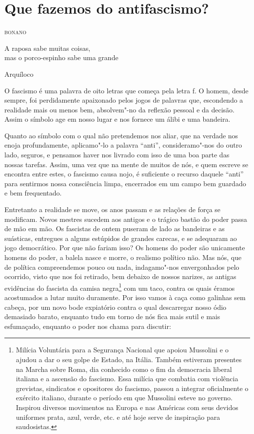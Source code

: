 \chapter{Que fazemos do antifascismo?}

\hfill{}\textsc{bonano}

\bigskip

\epigraph{A raposa sabe muitas coisas,\\mas o porco-espinho sabe uma grande}{Arquíloco}


O fascismo é uma palavra de oito letras que começa pela letra f. O
homem, desde sempre, foi perdidamente apaixonado pelos jogos de palavras
que, escondendo a realidade mais ou menos bem, absolvem"-no da reflexão
pessoal e da decisão. Assim o símbolo age em nosso lugar e nos fornece
um álibi e uma bandeira.

Quanto ao símbolo com o qual não pretendemos nos aliar, que na verdade
nos enoja profundamente, aplicamo"-lo a palavra ``anti'', consideramo"-nos
do outro lado, seguros, e pensamos haver nos livrado com isso de uma boa
parte das nossas tarefas. Assim, uma vez que na mente de muitos de nós,
e quem escreve se encontra entre estes, o fascismo causa nojo, é
suficiente o recurso daquele ``anti'' para sentirmos nossa consciência
limpa, encerrados em um campo bem guardado e bem frequentado.

Entretanto a realidade se move, os anos passam e as relações de força se
modificam. Novos mestres sucedem aos antigos e o trágico bastão do poder
passa de mão em mão. Os fascistas de ontem puseram de lado as bandeiras
e as suásticas, entregues a alguns estúpidos de grandes carecas, e se
adequaram ao jogo democrático. Por que não fariam isso? Os homens do
poder são unicamente homens do poder, a balela nasce e morre, o realismo
político não. Mas nós, que de política compreendemos pouco ou nada,
indagamo"-nos envergonhados pelo ocorrido, visto que nos foi retirado,
bem debaixo de nossos narizes, as antigas evidências do fascista da
camisa negra\footnote{Milícia Voluntária para a Segurança Nacional que apoiou Mussolini e o
  ajudou a dar o seu golpe de Estado, na Itália. Também estiveram
  presentes na Marcha sobre Roma, dia conhecido como o fim da democracia
  liberal italiana e a ascensão do fascismo. Essa milícia que combatia
  com violência grevistas, sindicatos e opositores do fascismo, passou a
  integrar oficialmente o exército italiano, durante o período em que
  Mussolini esteve no governo. Inspirou diversos movimentos na Europa e
  nas Américas com seus devidos uniformes prata, azul, verde, etc. e até
  hoje serve de inspiração para saudosistas.} com um taco, contra os quais éramos acostumados a lutar
muito duramente. Por isso vamos à caça como galinhas sem cabeça, por um
novo bode expiatório contra o qual descarregar nosso ódio demasiado
barato, enquanto tudo em torno de nós fica mais sutil e mais esfumaçado,
enquanto o poder nos chama para discutir:

